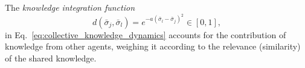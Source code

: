 \documentclass[12pt]{article}
\renewcommand{\emph}[1]{\textit{#1}}
\begin{document}
The \emph{knowledge integration function} 
\begin{equation}\label{eq:knowledge_integration_function}
	d(\bar{\sigma}_j,\bar{\sigma}_l) = e^{-a\left(\bar{\sigma}_l-\bar{\sigma}_j\right)^2}\in [0,1],
\end{equation}
\noindent in Eq.~\eqref{eq:collective_knowledge_dynamics} accounts for the contribution of knowledge from other agents, weighing it according to the relevance (similarity) of the shared knowledge. 
\end{document}
